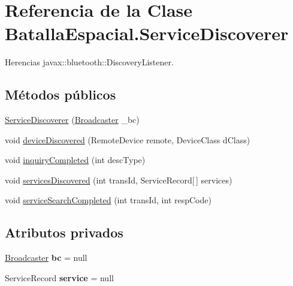 \hypertarget{classBatallaEspacial_1_1ServiceDiscoverer}{
\section{Referencia de la Clase BatallaEspacial.ServiceDiscoverer}
\label{classBatallaEspacial_1_1ServiceDiscoverer}
}


Herencias javax::bluetooth::DiscoveryListener.

\subsection*{Métodos públicos}
\begin{DoxyCompactItemize}
\item 
\hyperlink{classBatallaEspacial_1_1ServiceDiscoverer_a95046c1506d8ce9e3369fefa39b79715}{ServiceDiscoverer} (\hyperlink{classBatallaEspacial_1_1Broadcaster}{Broadcaster} \_\-bc)
\item 
void \hyperlink{classBatallaEspacial_1_1ServiceDiscoverer_a33ff8fd3dcfb60023edfacdefbdf85c9}{deviceDiscovered} (RemoteDevice remote, DeviceClass dClass)
\item 
void \hyperlink{classBatallaEspacial_1_1ServiceDiscoverer_a22214f40f4fed08e8d61e6c0c4cbf03e}{inquiryCompleted} (int descType)
\item 
void \hyperlink{classBatallaEspacial_1_1ServiceDiscoverer_a8ae6cdebc17cf67f1c291840df48d568}{servicesDiscovered} (int transId, ServiceRecord\mbox{[}$\,$\mbox{]} services)
\item 
void \hyperlink{classBatallaEspacial_1_1ServiceDiscoverer_aa95e2c4baf4ab791dbf01e1a35c18ea8}{serviceSearchCompleted} (int transId, int respCode)
\end{DoxyCompactItemize}
\subsection*{Atributos privados}
\begin{DoxyCompactItemize}
\item 
\hypertarget{classBatallaEspacial_1_1ServiceDiscoverer_af0948e02c91640e35689341047e98479}{
\hyperlink{classBatallaEspacial_1_1Broadcaster}{Broadcaster} {\bfseries bc} = null}
\label{classBatallaEspacial_1_1ServiceDiscoverer_af0948e02c91640e35689341047e98479}

\item 
\hypertarget{classBatallaEspacial_1_1ServiceDiscoverer_a1474b91ea9c0f533076daa89764ee0d0}{
ServiceRecord {\bfseries service} = null}
\label{classBatallaEspacial_1_1ServiceDiscoverer_a1474b91ea9c0f533076daa89764ee0d0}

\end{DoxyCompactItemize}


